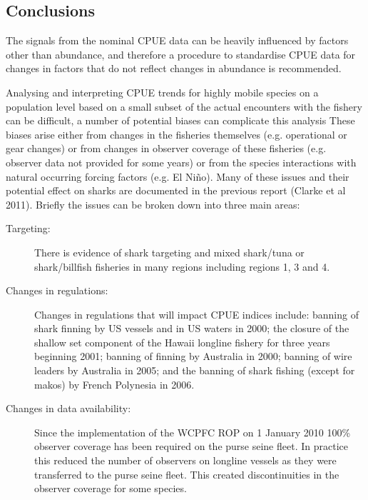 

\subsection{Conclusions}

The signals from the nominal  CPUE data can be heavily influenced by factors other than abundance, and therefore a procedure to standardise CPUE data for changes in factors  that do not reflect changes in abundance is recommended. 

 
Analysing and interpreting CPUE trends for highly mobile species on a population level based on a small subset of the actual encounters with the fishery can be difficult, a number of potential biases can complicate this analysis   These biases arise either from changes in the fisheries themselves (e.g. operational or gear changes) or from changes in observer coverage of these fisheries (e.g. observer data not provided for some years) or from the species interactions with natural occurring forcing factors (e.g. El Ni\~no). Many of these issues and their potential effect on sharks are documented in the previous report (Clarke et al 2011).  %
Briefly the issues can be broken down into three main areas:
\begin{description}
\item[Targeting:] There is evidence of shark targeting and mixed shark/tuna or shark/billfish fisheries in many regions including regions 1, 3 and 4. 
\item[Changes in regulations:] Changes in regulations that will impact CPUE indices include: banning of shark finning by US vessels and in US waters in 2000; the closure of the shallow set component of the Hawaii longline fishery for three years beginning 2001; banning of  finning by Australia in 2000; banning of wire leaders by Australia in 2005; and the banning of shark fishing (except for makos) by French Polynesia in 2006.
\item[Changes in data availability:] Since the implementation of the WCPFC ROP on 1 January 2010 100\% observer coverage has been required on the purse seine fleet. In practice this reduced the number of observers on longline vessels as they were transferred to the purse seine fleet. This created discontinuities in the observer coverage for some species.
\end{description}

